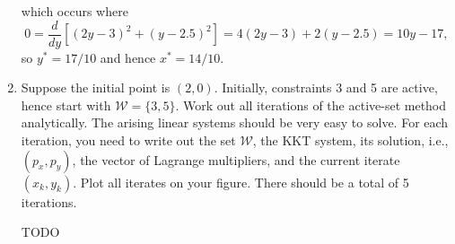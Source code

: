 \documentclass{../kin_math}
\begin{document}
\begin{questions}
\begin{enumerate}
\begin{solution}
      which occurs where
      \begin{equation*}
        0 = \frac{d}{dy} \left[(2y - 3)^2 + (y - 2.5)^2\right] = 4(2y - 3) + 2(y - 2.5) = 10y - 17,
      \end{equation*}
      so $y^* = 17 / 10$ and hence $x^* = 14 / 10$.
    \end{solution}
    \item Suppose the initial point is $(2, 0)$. Initially, constraints 3 and 5 are active, hence start with $\mathcal{W} = \{3, 5\}$. Work out all iterations of the active-set method analytically. The arising linear systems should be very easy to solve. For each iteration, you need to write out the set $\mathcal{W}$, the KKT system, its solution, i.e., $(p_x, p_y)$, the vector of Lagrange multipliers, and the current iterate $(x_k, y_k)$. Plot all iterates on your figure. There should be a total of 5 iterations.
    \begin{solution}
      TODO
    \end{solution}
  \end{enumerate}
\end{questions}
\end{document}
